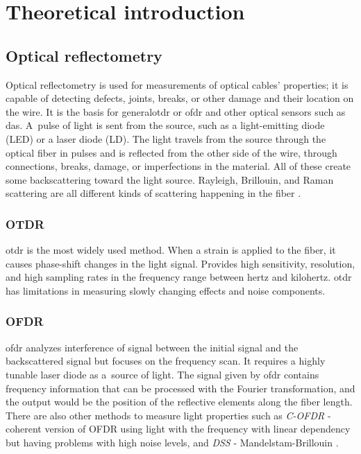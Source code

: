 \chapter{Theoretical introduction}


\section{Optical reflectometry}

Optical reflectometry is used for measurements of optical cables' properties; it is capable of detecting defects, joints, breaks, or other damage and their location on the wire. It is the basis for \ac{generalotdr} or \ac{ofdr} and other optical sensors such as \ac{das}. A~pulse of light is sent from the source, such as a light-emitting diode (LED) or a laser diode (LD). The light travels from the source through the optical fiber in pulses and is reflected from the other side of the wire, through connections, breaks, damage, or imperfections in the material. All of these create some backscattering toward the light source. Rayleigh, Brillouin, and Raman scattering are all different kinds of scattering happening in the fiber \cite{progress}. 

\subsection{OTDR}

\ac{otdr} is the most widely used method. When a strain is applied to the fiber, it causes phase-shift changes in the light signal. Provides high sensitivity, resolution, and high sampling rates in the frequency range between hertz and kilohertz. \ac{otdr} has limitations in measuring slowly changing effects and noise components.





\subsection{OFDR}

\ac{ofdr} analyzes interference of signal between the initial signal and the backscattered signal but focuses on the frequency scan. It requires a highly tunable laser diode as a~source of light. The signal given by \ac{ofdr} contains frequency information that can be processed with the Fourier transformation, and the output would be the position of the reflective elements along the fiber length. There are also other methods to measure light properties such as \textit{C-OFDR} - coherent version of OFDR using light with the frequency with linear dependency but having problems with high noise levels, and \textit{DSS} - Mandelstam-Brillouin \cite{kislov_das_newparadigm}.



